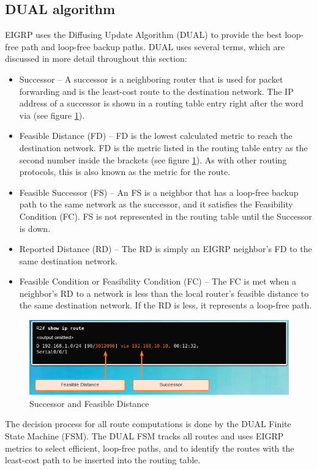 \subsection{DUAL algorithm}
EIGRP uses the Diffusing Update Algorithm (DUAL) to provide the best loop-free path and loop-free backup paths. DUAL uses several terms, which are discussed in more detail throughout this section:
\begin{itemize}
\item Successor -- A successor is a neighboring router that is used for packet forwarding and is the least-cost route to the destination network. The IP address of a successor is shown in a routing table entry right after the word via (see figure \ref{EIGRP-FD}). 
\item Feasible Distance (FD) -- FD is the lowest calculated metric to reach the destination network. FD is the metric listed in the routing table entry as the second number inside the brackets (see figure \ref{EIGRP-FD}). As with other routing protocols, this is also known as the metric for the route.
\item Feasible Successor (FS) -- An FS is a neighbor that has a loop-free backup path to the same network as the successor, and it satisfies the Feasibility Condition (FC). FS is not represented in the routing table until the Successor is down.
\item Reported Distance (RD) -- The RD is simply an EIGRP neighbor’s FD to the same destination network.
\item Feasible Condition or Feasibility Condition (FC) -- The FC is met when a neighbor’s RD to a network is less than the local router’s feasible distance to the same destination network. If the RD is less, it represents a loop-free path. 
\end{itemize}
\begin{figure}[hbtp]
\centering
\includegraphics[scale=1]{pictures/EIGRP-FD.png}
\caption{Successor and Feasible Distance} \label{EIGRP-FD}
\end{figure}
The decision process for all route computations is done by the DUAL Finite State Machine (FSM). The DUAL FSM tracks all routes and uses EIGRP metrics to select efficient, loop-free paths, and to identify the routes with the least-cost path to be inserted into the routing table.\par 
